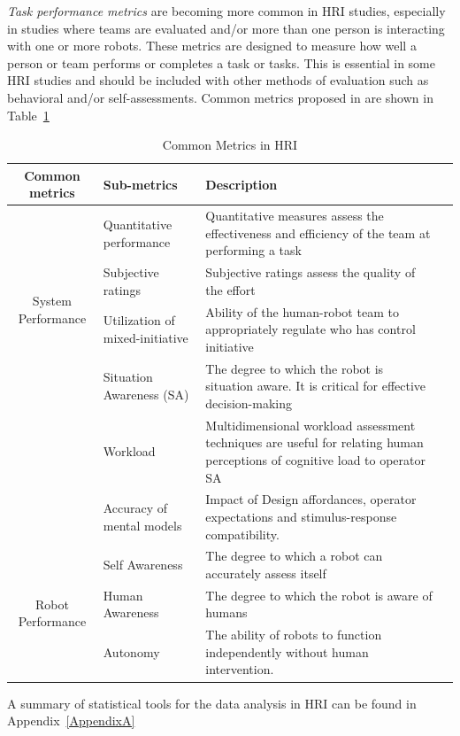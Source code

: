 \emph{Task performance metrics} are becoming more common in HRI studies, especially in studies where teams are evaluated and/or more than one person is interacting with one or more robots. These metrics are designed to measure how well a person or team performs or completes a task or tasks. This is essential in some HRI studies and should be included with other methods of evaluation such as behavioral and/or self-assessments. Common metrics proposed in \cite{Steinfeld2006} are shown in Table~\ref{table:hri_metrics}

\begin{table}[H]
\centering
\small
\caption{Common Metrics in HRI\cite{Steinfeld2006}}
\label{table:hri_metrics}
\begin{tabularx}{400pt}{c*3{X}}
\toprule
  \textbf{Common metrics} & \textbf{Sub-metrics} 
                          & \textbf{Description}
  \tabularnewline \midrule
  
  \multirow{4}{*}{System Performance} & Quantitative performance & Quantitative measures assess the
effectiveness and efficiency of the team at performing a task \\
                                      & Subjective ratings & Subjective ratings assess the quality
of the effort \\
                                      & Utilization of mixed-initiative & Ability of the human-robot team to appropriately regulate who has control initiative 
                                          \tabularnewline\midrule
                                          
  \multirow{4}{*}{Operator Performance} & Situation Awareness (SA) & The degree to which the robot is situation aware. It is critical for effective decision-making \\
                                      & Workload & Multidimensional workload assessment techniques are useful for relating human perceptions of cognitive load to operator SA \\
                                      & Accuracy of mental models & Impact of Design affordances, operator expectations and stimulus-response compatibility.
                                          \tabularnewline\midrule
  
  \multirow{4}{*}{Robot Performance} & Self Awareness & The degree to which a robot can accurately
assess itself \\
                                      & Human Awareness & The degree to which the robot is aware of humans \\
                                      & Autonomy & The ability of robots to function independently without human intervention.
                                          \tabularnewline                                
                                         
  										\bottomrule
\end{tabularx}
\end{table}

A summary of statistical tools for the data analysis in HRI can be found in Appendix~\ref{AppendixA}